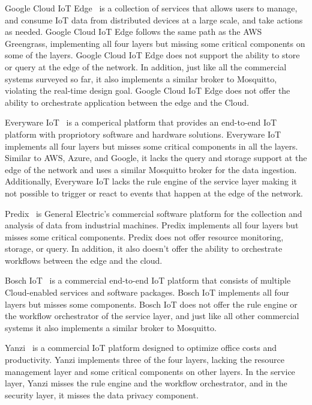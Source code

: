 Google Cloud IoT Edge~\cite{google} is a collection of services that allows  users to manage, and consume IoT data from distributed devices at a large scale, and take actions as needed. Google Cloud IoT Edge follows the same path as the AWS Greengrass, implementing all four layers but missing some critical components on some of the layers. Google Cloud IoT Edge does not support the ability to store or query at the edge of the network. In addition, just like all the commercial systems surveyed so far, it also implements a similar broker to Mosquitto, violating the real-time design goal. Google Cloud IoT Edge does not offer the ability to orchestrate application between the edge and the Cloud.

Everyware IoT~\cite{everyware} is a comperical platform that provides an end-to-end IoT platform with propriotory software and hardware solutions. Everyware IoT implements all four layers but misses some critical components in all the layers. Similar to AWS, Azure, and Google, it lacks the query and storage support at the edge of the network and uses a similar Mosquitto broker for the data ingestion. Additionally, Everyware IoT lacks the rule engine of the service layer making it not possible to trigger or react to events that happen at the edge of the network.

Predix~\cite{predix} is General Electric's commercial software platform for the collection and analysis of data from industrial machines. Predix implements all four layers but misses some critical components. Predix does not offer resource monitoring, storage, or query. In addition, it also doesn't offer the ability to orchestrate workflows between the edge and the cloud.

Bosch IoT~\cite{bosch} is a commercial end-to-end IoT platform that consists of multiple Cloud-enabled services and software packages. Bosch IoT implements all four layers but misses some components. Bosch IoT does not offer the rule engine or the workflow orchestrator of the service layer, and just like all other commercial systems it also implements a similar broker to Mosquitto.

Yanzi~\cite{yanzi} is a commercial IoT platform designed to optimize office costs and productivity. Yanzi implements three of the four layers, lacking the resource management layer and some critical components on other layers. In the service layer, Yanzi misses the rule engine and the workflow orchestrator, and in the security layer, it misses the data privacy component.

